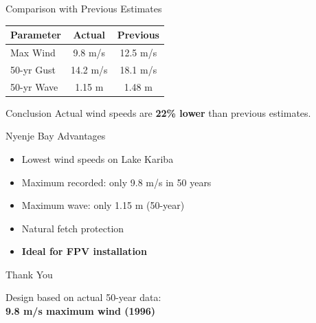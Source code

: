 \documentclass{beamer}
\begin{document}
\begin{frame}{Comparison with Previous Estimates}
\begin{table}
\centering
\begin{tabular}{lcc}
\hline
\textbf{Parameter} & \textbf{Actual} & \textbf{Previous} \\
\hline
Max Wind & 9.8 m/s & 12.5 m/s \\
50-yr Gust & 14.2 m/s & 18.1 m/s \\
50-yr Wave & 1.15 m & 1.48 m \\
\hline
\end{tabular}
\end{table}

\begin{block}{Conclusion}
Actual wind speeds are \textbf{22\% lower} than previous estimates.
\end{block}
\end{frame}

\begin{frame}{Nyenje Bay Advantages}
\begin{itemize}
    \item Lowest wind speeds on Lake Kariba
    \item Maximum recorded: only 9.8 m/s in 50 years
    \item Maximum wave: only 1.15 m (50-year)
    \item Natural fetch protection
    \item \textbf{Ideal for FPV installation}
\end{itemize}
\end{frame}

\begin{frame}
\begin{center}
\Huge Thank You

\vspace{0.5cm}
\Large Design based on actual 50-year data:\\
\textbf{9.8 m/s maximum wind (1996)}
\end{center}
\end{frame}
\end{document}
